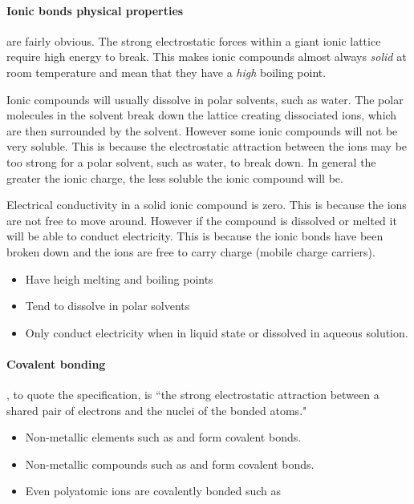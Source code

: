 	\paragraph{Ionic bonds physical properties} are fairly obvious. The strong electrostatic forces within a giant ionic lattice require high energy to break. This makes ionic compounds almost always \textit{solid} at room temperature and mean that they have a \textit{high} boiling point.
	 
	Ionic compounds will usually dissolve in polar solvents, such as water. The polar molecules in the solvent break down the lattice creating dissociated ions, which are then surrounded by the solvent. However some ionic compounds will not be very soluble. This is because the electrostatic attraction between the ions may be too strong for a polar solvent, such as water, to break down. In general the greater the ionic charge, the less soluble the ionic compound will be.
	 
	Electrical conductivity in a solid ionic compound is zero. This is because the ions are not free to move around. However if the compound is dissolved or melted it will be able to conduct electricity. This is because the ionic bonds have been broken down and the ions are free to carry charge (mobile charge carriers).
	 
	\begin{itemize}
		\item Have heigh melting and boiling points
		\item Tend to dissolve in polar solvents
		\item Only conduct electricity when in liquid state or dissolved in aqueous solution.
	\end{itemize}
	 
	\paragraph{Covalent bonding} , to quote the specification, is ``the strong electrostatic attraction between a shared pair of electrons and the nuclei of the bonded atoms."
	\begin{itemize}
	 	\item Non-metallic elements such as  and  form covalent bonds.
	 	\item Non-metallic compounds such as  and  form covalent bonds.
	 	\item Even polyatomic ions are covalently bonded such as 
	\end{itemize}
	
